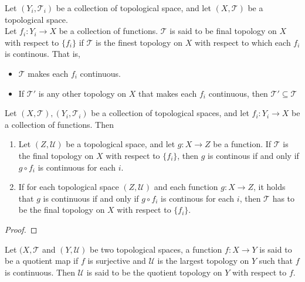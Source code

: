 \begin{definition}
    Let $(Y_i,\mathcal{T}_i)$ be a collection of topological space, and let $(X,\mathcal{T})$ be a topological space.\\
    Let $f_i:Y_i\to X$ be a collection of functions.
    $\mathcal{T}$ is said to be final topology on $X$ with respect to $\{f_i\}$ if $\mathcal{T}$ is the finest topology on $X$ with respect to which each $f_i$ is continous. That is,
\begin{itemize}
        \item $\mathcal{T}$ makes each $f_i$ continuous.
        \item If $\mathcal{T}'$ is any other topology on $X$ that makes each $f_i$ continuous, then $\mathcal{T}'\subseteq\mathcal{T}$
\end{itemize}
\end{definition}
\vspace{5mm}
\begin{theorem}
    Let $(X,\mathcal{T}), (Y_i,\mathcal{T}_i)$ be a collection of topological spaces, and let $f_i:Y_i\to X$ be a collection of functions. Then
    \begin{enumerate}
        \item Let $(Z,\mathcal{U})$ be a topological space, and let $g:X\to Z$ be a function. If $\mathcal{T}$ is the final topology on $X$ with respect to $\{f_i\}$, then $g$ is continous if and only if $g\circ f_i$ is continuous for each $i$.
        \item If for each topological space $(Z,\mathcal{U})$ and each function $g:X\to Z$, it holds that $g$ is continuous if and only if $g\circ f_i$ is continous for each $i$, then $\mathcal{T}$ has to be the final topology on $X$ with respect to $\{f_i\}$.
    \end{enumerate}
\end{theorem}
\begin{proof}
     
\end{proof}
\vspace{0.4cm}
\begin{definition}
    Let $(X,\mathcal{T}$ and $(Y,\mathcal{U})$ be two topological spaces, a function $f:X\to Y$ is said to be a quotient map if $f$ is surjective and $\mathcal{U}$ is the largest topology on $Y$ such that $f$ is continuous. Then $\mathcal{U}$ is said to be the quotient topology on $Y$ with respect to $f$.
\end{definition}

